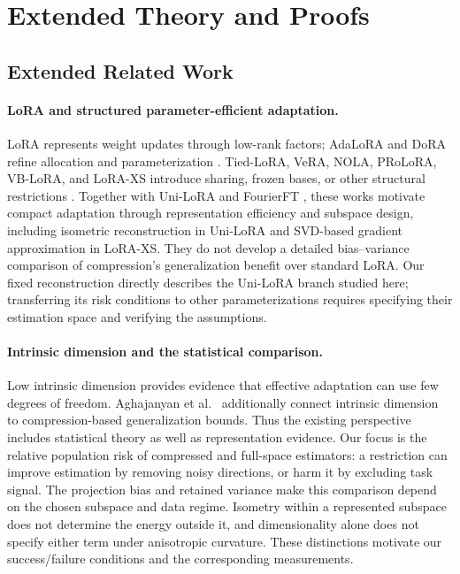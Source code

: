 \section{Extended Theory and Proofs}
\label{app:theory}
\subsection{Extended Related Work}
\label{app:related}

\paragraph{LoRA and structured parameter-efficient adaptation.}
LoRA \citep{hu2022lora} represents weight updates through low-rank factors; AdaLoRA and DoRA refine allocation and parameterization \citep{zhang2023adalora,liu2024dora}. Tied-LoRA, VeRA, NOLA, PRoLoRA, VB-LoRA, and LoRA-XS introduce sharing, frozen bases, or other structural restrictions \citep{renduchintala2024tied,kopiczko2024vera,koohpayegani2024nola,wang2024prolora,li2024vb,balazy2025lora}. Together with Uni-LoRA and FourierFT \citep{li2025unilora,gao2024fourierft}, these works motivate compact adaptation through representation efficiency and subspace design, including isometric reconstruction in Uni-LoRA and SVD-based gradient approximation in LoRA-XS. They do not develop a detailed bias--variance comparison of compression's generalization benefit over standard LoRA. Our fixed reconstruction directly describes the Uni-LoRA branch studied here; transferring its risk conditions to other parameterizations requires specifying their estimation space and verifying the assumptions.

\paragraph{Intrinsic dimension and the statistical comparison.}
Low intrinsic dimension provides evidence that effective adaptation can use few degrees of freedom. Aghajanyan et al.\ \citep{aghajanyan2021intrinsic} additionally connect intrinsic dimension to compression-based generalization bounds. Thus the existing perspective includes statistical theory as well as representation evidence. Our focus is the relative population risk of compressed and full-space estimators: a restriction can improve estimation by removing noisy directions, or harm it by excluding task signal. The projection bias and retained variance make this comparison depend on the chosen subspace and data regime. Isometry within a represented subspace does not determine the energy outside it, and dimensionality alone does not specify either term under anisotropic curvature. These distinctions motivate our success/failure conditions and the corresponding measurements.

